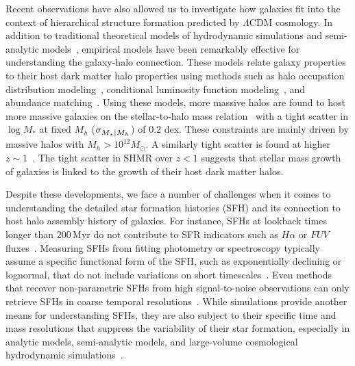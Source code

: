 \documentclass[12pt, letterpaper, preprint, tighten]{aastex62}
\newcommand{\siglogm}{\sigma_{\scaleto{M_*|M_h}{8pt}}}
\begin{document}
Recent observations have also allowed us to investigate how galaxies fit
into the context of hierarchical structure formation predicted by 
$\Lambda$CDM cosmology. In addition to traditional theoretical
models of hydrodynamic simulations and semi-analytic models~\citep[see][for reviews]{silk2012, somerville2015},
empirical models have been remarkably effective for understanding the 
galaxy-halo connection. These models relate galaxy properties to their 
host dark matter halo properties using methods such as halo occupation 
distribution modeling~\citep[HOD; \emph{e.g.}][]{zheng2007,zehavi2011,leauthaud2012,parejko2013,zu2015},
conditional luminosity function modeling~\citep[\emph{e.g.}][]{yang2009}, 
and abundance matching~\citep[\emph{e.g.}][]{kravtsov2004, vale2006, conroy2009, moster2013, reddick2013}.
Using these models, more massive halos are found to host more massive 
galaxies on the stellar-to-halo mass relation~\citep[hereafter SHMR;][]{mandelbaum2006a, conroy2007, more2011, leauthaud2012, tinker2013, velander2014, han2015, zu2015, gu2016, lange2018a} 
with a tight scatter in $\log M_*$ at fixed $M_h$ ($\siglogm$) of $0.2$ dex. 
These constraints are mainly driven by massive halos with $M_h > 10^{12} M_\odot$. 
A similarly tight scatter is found at higher $z\sim1$~\citep{leauthaud2012, tinker2013, patel2015}.
The tight scatter in SHMR over $z < 1$ suggests that stellar mass growth of 
galaxies is linked to the growth of their host dark matter halos.

Despite these developments, we face a number of challenges when it comes
to understanding the detailed star formation histories (SFH) and its
connection to host halo assembly history of galaxies.
For instance, SFHs at lookback times longer than $200\,\mathrm{Myr}$
do not contribute to SFR indicators such as $H\alpha$ or $FUV$ fluxes~\cite{sparre2017}.
Measuring SFHs from fitting photometry or spectroscopy typically
assume a specific functional form of the SFH, such as exponentially
declining or lognormal, that do not include variations on short
timescales~\citep[\emph{e.g.}][]{wilkinson2017, carnall2018}.
Even methods that recover non-parametric SFHs from high signal-to-noise
observations can only retrieve SFHs in coarse temporal resolutions~\citep[\emph{e.g.}][]{tojeiro2009, leja2018a}.
While simulations provide another means for understanding SFHs,
they are also subject to their specific time and mass resolutions that
suppress the variability of their star formation, especially in
analytic models, semi-analytic models, and large-volume cosmological
hydrodynamic simulations~\citep[][see also Figure~\ref{fig:illsfh}]{sparre2017}. %
\end{document}
